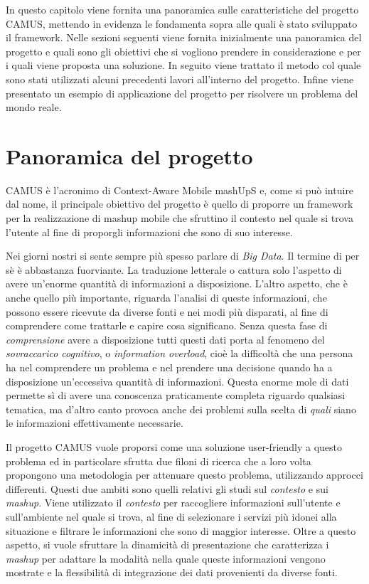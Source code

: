 In questo capitolo viene fornita una panoramica sulle caratteristiche del progetto CAMUS, mettendo in evidenza le fondamenta sopra alle quali è stato sviluppato il framework. Nelle sezioni seguenti viene fornita inizialmente una panoramica del progetto e quali sono gli obiettivi che si vogliono prendere in considerazione e per i quali viene proposta una soluzione. In seguito viene trattato il metodo col quale sono stati utilizzati alcuni precedenti lavori all'interno del progetto. Infine viene presentato un esempio di applicazione del progetto per risolvere un problema del mondo reale.

\section{Panoramica del progetto\label{sec:panoramica-progetto}}

CAMUS è l'acronimo di Context-Aware Mobile mashUpS e, come si può intuire dal nome, il principale obiettivo del progetto è quello di proporre un framework per la realizzazione di mashup mobile che sfruttino il contesto nel quale si trova l'utente al fine di proporgli informazioni che sono di suo interesse.

Nei giorni nostri si sente sempre più spesso parlare di \emph{Big Data}. Il termine di per sè è abbastanza fuorviante. La traduzione letterale  o  cattura solo l'aspetto di avere un'enorme quantità di informazioni a disposizione. L'altro aspetto, che è anche quello più importante, riguarda l'analisi di queste informazioni, che possono essere ricevute da diverse fonti e nei modi più disparati, al fine di comprendere come trattarle e capire cosa significano. Senza questa fase di \emph{comprensione} avere a disposizione tutti questi dati porta al fenomeno del \emph{sovraccarico cognitivo}, o \emph{information overload}, cioè la difficoltà che una persona ha nel comprendere un problema e nel prendere una decisione quando ha a disposizione un'eccessiva quantità di informazioni. Questa enorme mole di dati permette sì di avere una conoscenza praticamente completa riguardo qualsiasi tematica, ma d'altro canto provoca anche dei problemi sulla scelta di \emph{quali} siano le informazioni effettivamente necessarie. 
 
 Il progetto CAMUS vuole proporsi come una soluzione user-friendly a questo problema ed in particolare sfrutta due filoni di ricerca che a loro volta propongono una metodologia per attenuare questo problema, utilizzando approcci differenti. Questi due ambiti sono quelli relativi gli studi sul \emph{contesto} e sui \emph{mashup}. Viene utilizzato il \emph{contesto} per raccogliere informazioni sull'utente e sull'ambiente nel quale si trova, al fine di selezionare i servizi più idonei alla situazione e filtrare le informazioni che sono di maggior interesse. Oltre a questo aspetto, si vuole sfruttare la dinamicità di presentazione che caratterizza i \emph{mashup} per adattare la modalità nella quale queste informazioni vengono mostrate e la flessibilità di integrazione dei dati provenienti da diverse fonti.

